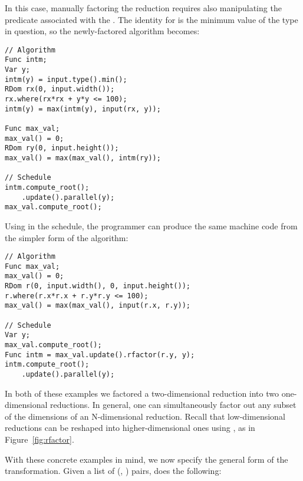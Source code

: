 In this case, manually factoring the reduction requires also manipulating the predicate associated with the . The identity for  is the minimum value of the type in question, so the newly-factored algorithm becomes:

\begin{lstlisting}
// Algorithm
Func intm;
Var y;
intm(y) = input.type().min();
RDom rx(0, input.width());
rx.where(rx*rx + y*y <= 100);
intm(y) = max(intm(y), input(rx, y));

Func max_val;
max_val() = 0;
RDom ry(0, input.height());
max_val() = max(max_val(), intm(ry));

// Schedule
intm.compute_root();
    .update().parallel(y);
max_val.compute_root();
\end{lstlisting}

Using  in the schedule, the programmer can produce the same machine code from the simpler form of the algorithm:

\begin{lstlisting}
// Algorithm
Func max_val;
max_val() = 0;
RDom r(0, input.width(), 0, input.height());
r.where(r.x*r.x + r.y*r.y <= 100);
max_val() = max(max_val(), input(r.x, r.y));

// Schedule
Var y;
max_val.compute_root();
Func intm = max_val.update().rfactor(r.y, y);
intm.compute_root();
    .update().parallel(y);
\end{lstlisting}

In both of these examples we factored a two-dimensional reduction into two one-dimensional reductions. In general, one can simultaneously factor out any subset of the dimensions of an N-dimensional reduction. Recall that low-dimensional reductions can be reshaped into higher-dimensional ones using , as in Figure~\ref{fig:rfactor}.

With these concrete examples in mind, we now specify the general form of the transformation. Given a list of (, ) pairs,  does the following:

